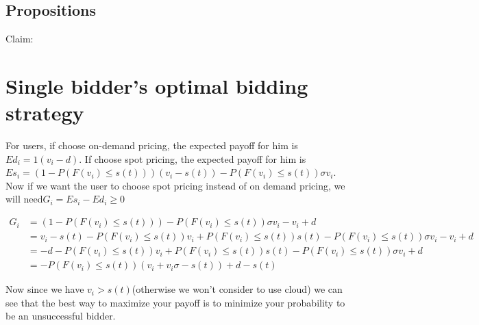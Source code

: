 \documentclass[11pt]{article}
\begin{document}
\subsection{Propositions}
Claim: 


\section{Single bidder's optimal bidding strategy}
For users, if choose on-demand pricing, the expected payoff for him is $Ed_i=1(v_i-d)$. If choose spot pricing, the expected payoff for him is $Es_i=(1-P(F(v_i)\leq s(t)))(v_i-s(t))-P(F(v_i)\leq s(t))\sigma v_i$. Now if we want the user to choose spot pricing instead of on demand pricing, we will need$G_i=Es_i-Ed_i\geq 0$

\begin{equation} 
\begin{split}
G_i & =(1-P(F(v_i)\leq s(t)))-P(F(v_i)\leq s(t))\sigma v_i-v_i+d\\
& =v_i-s(t)-P(F(v_i)\leq s(t))v_i+P(F(v_i)\leq s(t))s(t)-P(F(v_i)\leq s(t))\sigma v_i-v_i+d\\
& =-d-P(F(v_i)\leq s(t))v_i+P(F(v_i)\leq s(t))s(t)-P(F(v_i)\leq s(t))\sigma v_i+d\\
& =-P(F(v_i)\leq s(t))(v_i+v_i\sigma-s(t))+d-s(t)
\end{split}
\end{equation}

Now since we have $v_i > s(t)$(otherwise we won't consider to use cloud) we can see that the best way to maximize your payoff is to minimize your probability to be an unsuccessful bidder.



\end{document}
